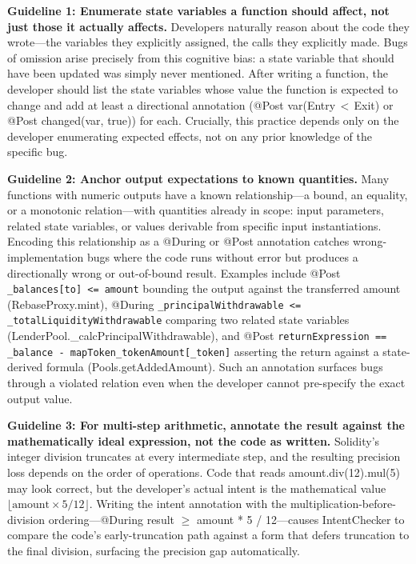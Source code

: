 \documentclass[pdflatex,sn-basic]{sn-jnl}%
\theoremstyle{thmstyleone}%
\theoremstyle{thmstyletwo}%
\theoremstyle{thmstylethree}%
\begin{document}
\smallskip
\noindent\textbf{Guideline 1: Enumerate state variables a function should affect, not just those it actually affects.}
Developers naturally reason about the code they wrote---the variables they explicitly assigned, the calls they explicitly made.
Bugs of omission arise precisely from this cognitive bias: a state variable that should have been updated was simply never mentioned.
After writing a function, the developer should list the state variables whose value the function is expected to change and add at least a directional annotation (@Post var(Entry\,$<$\,Exit) or @Post changed(var, true)) for each.
Crucially, this practice depends only on the developer enumerating expected effects, not on any prior knowledge of the specific bug.

\smallskip
\noindent\textbf{Guideline 2: Anchor output expectations to known quantities.}
Many functions with numeric outputs have a known relationship---a bound, an equality, or a monotonic relation---with quantities already in scope: input parameters, related state variables, or values derivable from specific input instantiations.
Encoding this relationship as a @During or @Post annotation catches wrong-implementation bugs where the code runs without error but produces a directionally wrong or out-of-bound result.
Examples include @Post \texttt{\_balances[to] <= amount} bounding the output against the transferred amount (RebaseProxy.mint), @During \texttt{\_principalWithdrawable <= \_totalLiquidityWithdrawable} comparing two related state variables (LenderPool.\_calcPrincipalWithdrawable), and @Post \texttt{returnExpression == \_balance - mapToken\_tokenAmount[\_token]} asserting the return against a state-derived formula (Pools.getAddedAmount).
Such an annotation surfaces bugs through a violated relation even when the developer cannot pre-specify the exact output value.

\smallskip
\noindent\textbf{Guideline 3: For multi-step arithmetic, annotate the result against the mathematically ideal expression, not the code as written.}
Solidity's integer division truncates at every intermediate step, and the resulting precision loss depends on the order of operations.
Code that reads amount.div(12).mul(5) may look correct, but the developer's actual intent is the mathematical value $\lfloor\text{amount} \times 5 / 12\rfloor$.
Writing the intent annotation with the multiplication-before-division ordering---@During result $\geq$ amount * 5 / 12---causes IntentChecker to compare the code's early-truncation path against a form that defers truncation to the final division, surfacing the precision gap automatically.
\end{document}
